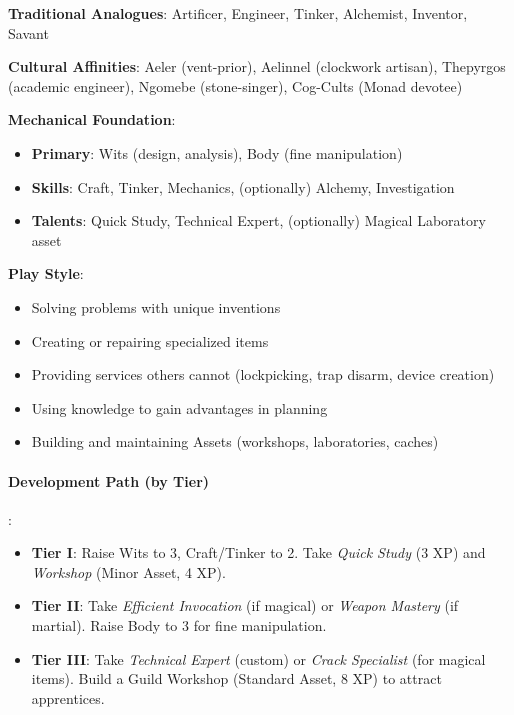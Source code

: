 \textbf{Traditional Analogues}: Artificer, Engineer, Tinker, Alchemist, Inventor, Savant

\textbf{Cultural Affinities}: Aeler (vent-prior), Aelinnel (clockwork artisan), Thepyrgos (academic engineer), Ngomebe (stone-singer), Cog-Cults (Monad devotee)

\textbf{Mechanical Foundation}:
\begin{itemize}
\item \textbf{Primary}: Wits (design, analysis), Body (fine manipulation)
\item \textbf{Skills}: Craft, Tinker, Mechanics, (optionally) Alchemy, Investigation
\item \textbf{Talents}: Quick Study, Technical Expert, (optionally) Magical Laboratory asset
\end{itemize}

\textbf{Play Style}:
\begin{itemize}
\item Solving problems with unique inventions
\item Creating or repairing specialized items
\item Providing services others cannot (lockpicking, trap disarm, device creation)
\item Using knowledge to gain advantages in planning
\item Building and maintaining Assets (workshops, laboratories, caches)
\end{itemize}

\paragraph{Development Path (by Tier)}:
\begin{itemize}
\item \textbf{Tier I}: Raise Wits to 3, Craft/Tinker to 2. Take \emph{Quick Study} (3 XP) and \emph{Workshop} (Minor Asset, 4 XP).
\item \textbf{Tier II}: Take \emph{Efficient Invocation} (if magical) or \emph{Weapon Mastery} (if martial). Raise Body to 3 for fine manipulation.
\item \textbf{Tier III}: Take \emph{Technical Expert} (custom) or \emph{Crack Specialist} (for magical items). Build a Guild Workshop (Standard Asset, 8 XP) to attract apprentices.
\end{itemize}

